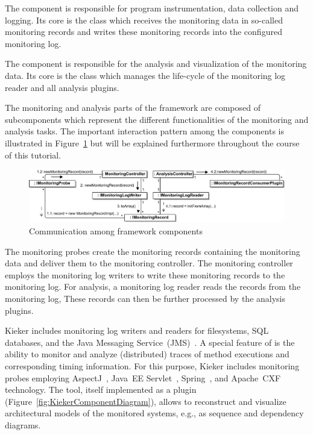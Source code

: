 \noindent The \KiekerMonitoringPart{} component is responsible for program instrumentation, data collection and logging. Its core is the class  which receives the monitoring data in so-called monitoring records and writes these monitoring records into the configured monitoring log. 

The component \KiekerAnalysisPart{} is responsible for the analysis and visualization of the monitoring data. Its core is the class  which manages the life-cycle of the monitoring log reader and all analysis plugins.

The monitoring and analysis parts of the \Kieker{} framework are composed of subcomponents which represent the different functionalities of the monitoring and analysis tasks. The important interaction pattern among the components is illustrated in Figure~\ref{fig:KiekerCommunicationDiagram} but will be explained furthermore throughout the course of this tutorial. 

\begin{figure}[H]\centering
\includegraphics[width=1\textwidth]{images/kiekerCommunications-revisedReArranged-woMonitoringLog-bw-newNames}
\caption{Communication among \Kieker{} framework components}
\label{fig:KiekerCommunicationDiagram}
\end{figure}
		
\noindent The monitoring probes create the monitoring records containing the %
monitoring data and deliver them to the monitoring controller. %
The monitoring controller employs the monitoring log writers to write these %
monitoring records to the monitoring log. %
For analysis, a monitoring log reader reads the records from the monitoring log, %
These records can then be further processed by the analysis plugins.


Kieker includes monitoring log writers and readers for filesystems, SQL %
databases, and the Java Messaging Service~(JMS)~\cite{JMS-WebSite}. %
A special feature of \Kieker{} is the ability to monitor and analyze (distributed) %
traces of method executions and corresponding timing information. %
For this purpose, Kieker includes monitoring probes employing %
AspectJ~\cite{AspectJ-WebSite}, %
Java~EE Servlet~\cite{JavaServletTechnology-WebSite}, %
Spring~\cite{Spring-WebSite}, and %
Apache~CXF~\cite{CXF-WebSite} technology. %
The \KiekerTraceAnalysis{} tool, itself implemented as a \KiekerAnalysisPart{} %
plugin (Figure~\ref{fig:KiekerComponentDiagram}), allows to reconstruct and visualize architectural models of the monitored %
systems, e.g., as sequence and dependency diagrams.

